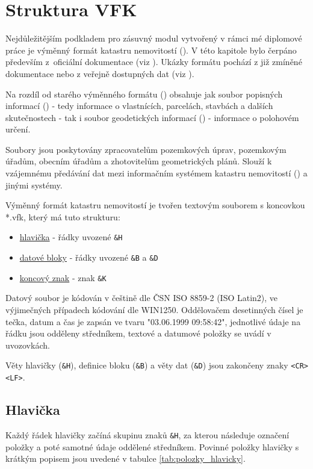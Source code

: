 \chapter{Struktura VFK}
\label{vfk}

Nejdůležitějším podkladem pro zásuvný modul vytvořený v rámci mé diplomové práce je výměnný formát katastru nemovitostí (). V této kapitole bylo čerpáno především z~oficiální dokumentace (viz \citep{struktura_vfk}). Ukázky formátu pochází  z již zmíněné dokumentace nebo z veřejně dostupných dat (viz \citep{zdroj_vfk}).

Na rozdíl od starého výměnného formátu () obsahuje  jak soubor popisných informací () - tedy informace o vlastnících, parcelách, stavbách a dalších skutečnostech - tak i soubor geodetických informací () - informace o polohovém určení.

Soubory  jsou poskytovány zpracovatelům pozemkových úprav, pozemkovým úřadům, obecním úřadům a zhotovitelům geometrických plánů. Slouží k vzájemnému předávání dat mezi informačním systémem katastru nemovitostí () a jinými systémy.

Výměnný formát katastru nemovitostí je tvořen textovým souborem s koncovkou *.vfk, který má tuto strukturu:
	\begin{itemize}[leftmargin=1.5cm]
		\item \underline{hlavička} - řádky uvozené \texttt{\&H}
		\item \underline{datové bloky} - řádky uvozené \texttt{\&B} a \texttt{\&D}
		\item \underline{koncový znak} - znak \texttt{\&K}
	\end{itemize}

Datový soubor je kódován v češtině dle ČSN ISO 8859-2 (ISO Latin2), ve výjimečných případech kódování dle
WIN1250. Oddělovačem desetinných čísel je tečka, datum a čas je zapsán ve tvaru "03.06.1999 09:58:42", jednotlivé údaje na řádku jsou odděleny středníkem, textové a datumové položky se uvádí v uvozovkách.

Věty hlavičky (\texttt{\&H}), definice bloku (\texttt{\&B}) a věty dat (\texttt{\&D}) jsou zakončeny znaky \texttt{<CR><LF>}.

\section{Hlavička}
\label{hlavicka}

Každý řádek hlavičky začíná skupinu znaků \texttt{\&H}, za kterou následuje označení položky a poté samotné údaje oddělené středníkem. Povinné položky hlavičky s krátkým popisem jsou uvedené v tabulce \ref{tab:polozky_hlavicky}.

